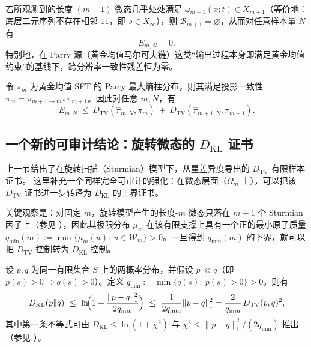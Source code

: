 \begin{corollary}\label{cor:multiscale-zero-stable}
若所观测到的长度-$(m{+}1)$ 微态几乎处处满足 $\omega_{m+1}(x;t)\in X_{m+1}$（等价地：底层二元序列不存在相邻 $11$，即 $s\in X_\infty$），则 $\mathcal{B}_{m+1}=\varnothing$，从而对任意样本量 $N$ 有
\[
E_{m,N}=0.
\]
特别地，在 Parry 源（黄金均值马尔可夫链）这类“输出过程本身即满足黄金均值约束”的基线下，跨分辨率一致性残差恒为零。
\end{corollary}

\begin{proposition}\label{prop:multiscale-residual-parry-bound}
令 \(\pi_m\) 为黄金均值 SFT 的 Parry 最大熵柱分布，则其满足投影一致性 \(\pi_m=\pi_{m+1\to m*}\pi_{m+1}\)。因此对任意 \(m,N\)，有
\[
E_{m,N}\ \le\ D_{\mathrm{TV}}(\hat{\pi}_{m,N},\pi_m)\ +\ D_{\mathrm{TV}}(\hat{\pi}_{m+1,N},\pi_{m+1}).
\]
\end{proposition}



\subsection{一个新的可审计结论：旋转微态的 \texorpdfstring{$D_{\mathrm{KL}}$}{KL} 证书}

上一节给出了在旋转扫描（Sturmian）模型下，从星差异度导出的 \(D_{\mathrm{TV}}\) 有限样本证书。
这里补充一个同样完全可审计的强化：在微态层面（\(\Omega_m\) 上），可以把该 \(D_{\mathrm{TV}}\) 证书进一步转译为 \(D_{\mathrm{KL}}\) 的上界证书。

关键观察是：对固定 \(m\)，旋转模型产生的长度-\(m\) 微态只落在 \(m{+}1\) 个 Sturmian 因子上（参见 \cite{MorseHedlund1940,LindMarcus1995}），因此其极限分布 \(\mu_m\) 在该有限支撑上具有一个正的最小原子质量
\(
q_{\min}(m):=\min\{\mu_m(u):\ u\in\mathcal{W}_m\}>0
\)。一旦得到 \(q_{\min}(m)\) 的下界，就可以把 \(D_{\mathrm{TV}}\) 控制转为 \(D_{\mathrm{KL}}\) 控制。

\begin{lemma}[从 TV 到 KL：由最小原子下界给出的显式上界]\label{lem:kl-from-tv-qmin}
设 \(p,q\) 为同一有限集合 \(S\) 上的两概率分布，并假设 \(p\ll q\)（即 \(p(s)>0\Rightarrow q(s)>0\)）。定义
\(
q_{\min}:=\min\{q(s):\ p(s)>0\}>0
\)。则有
\[
D_{\mathrm{KL}}(p\|q)\ \le\ \ln\!\Bigl(1+\frac{\|p-q\|_1^2}{2q_{\min}}\Bigr)
\ \le\ \frac{1}{2q_{\min}}\|p-q\|_1^2
=\frac{2}{q_{\min}}\,D_{\mathrm{TV}}(p,q)^2,
\]
其中第一条不等式可由 \(D_{\mathrm{KL}}\le \ln(1+\chi^2)\) 与 \(\chi^2\le \|p-q\|_1^2/(2q_{\min})\) 推出（参见 \cite{SasonVerdu2016fDivergence}）。
\end{lemma}

